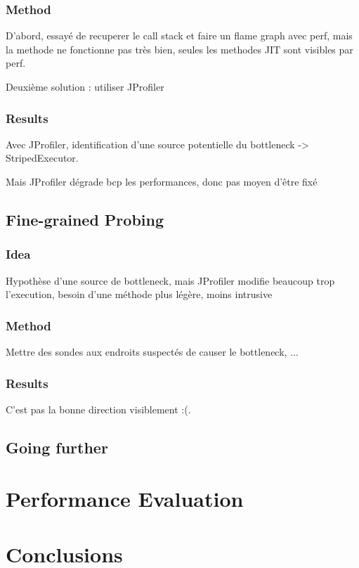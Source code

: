 \documentclass[conference]{IEEEtran}
\begin{document}
\subsubsection{Method}
D'abord, essayé de recuperer le call stack et faire un flame graph avec perf, mais la methode ne fonctionne pas très bien, seules les methodes JIT sont visibles par perf.

Deuxième solution : utiliser JProfiler
\subsubsection{Results}
Avec JProfiler, identification d'une source potentielle du bottleneck -> StripedExecutor.

Mais JProfiler dégrade bcp les performances, donc pas moyen d'être fixé

\subsection{Fine-grained Probing}
\subsubsection{Idea}
Hypothèse d'une source de bottleneck, mais JProfiler modifie beaucoup trop l'execution, besoin d'une méthode plus légère, moins intrusive

\subsubsection{Method}
Mettre des sondes aux endroits suspectés de causer le bottleneck, ...
\subsubsection{Results}
C'est pas la bonne direction visiblement :(.

\subsection{Going further}
\bigbreak



\bigbreak
\section{Performance Evaluation}
\bigbreak
\section{Conclusions}
\bigbreak
\end{document}
